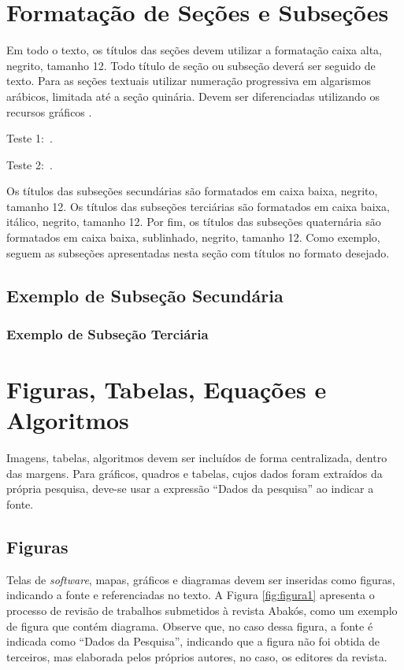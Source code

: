 \documentclass[a4paper,12pt]{article}
\begin{document}
	
	\section{Formatação de Seções e Subseções}
	\label{sec:sec}
	
	Em todo o texto, os títulos das seções devem utilizar a formatação caixa alta, negrito, tamanho 12. Todo título de seção ou subseção deverá ser seguido de texto. Para as seções textuais utilizar numeração progressiva em algarismos arábicos, limitada até a seção quinária. Devem ser diferenciadas utilizando os recursos gráficos \cite{manualpucartigo}.
	
	Teste 1:~\cite{ponciano2018agreement, ferreira}. 
	
	Teste 2:~. 
	
	
	Os títulos das subseções secundárias são formatados em caixa baixa, negrito, tamanho 12. Os títulos das subseções terciárias são formatados em caixa baixa, itálico, negrito, tamanho 12. Por fim, os títulos das subseções quaternária são formatados em caixa baixa, sublinhado, negrito, tamanho 12. Como exemplo, seguem as subseções apresentadas nesta seção com títulos no formato desejado.
	
	\subsection{Exemplo de Subseção Secundária}
	\subsubsection{Exemplo de Subseção Terciária}
	
	
	\section{Figuras, Tabelas, Equações e Algoritmos}
	\label{sec:figTabEqAlg}
	
	Imagens, tabelas, algoritmos devem ser incluídos de forma centralizada, dentro das margens. Para gráficos, quadros e tabelas, cujos dados foram extraídos da própria pesquisa, deve-se  usar a expressão “Dados da pesquisa” ao indicar a fonte.
	
	\subsection{Figuras}
	
	Telas de \textit{software}, mapas, gráficos e diagramas devem ser inseridas como figuras, indicando a fonte e referenciadas no texto. A Figura \ref{fig:figura1} apresenta o processo de revisão de trabalhos submetidos à revista Abakós, como um exemplo de figura que contém diagrama. Observe que, no caso dessa figura, a fonte é indicada como ``Dados da Pesquisa'', indicando que a figura não foi obtida de terceiros, mas elaborada pelos próprios autores, no caso, os editores da revista.
	
\end{document}
